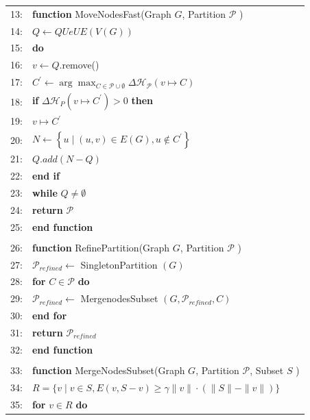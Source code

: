 \documentclass {article}
\begin{document}
	\begin{table}[H]
		\centering
		\begin{tabular}{rl}
			13: & \textbf{function} MoveNodesFast(Graph $G$, Partition $\mathcal{P}$ ) \\
			14: & \quad $Q \leftarrow {QUeUE}(V(G))$ \\
			15: & \quad \textbf{do} \\
			16: & \qquad $v \leftarrow Q$.remove() \\
			17: & \qquad $C^{\prime} \leftarrow \arg \max _{C \in \mathcal{P} \cup \emptyset} \Delta \mathcal{H}_{\mathcal{P}}(v \mapsto C)$ \\
			18: & \qquad \textbf{if} $\Delta \mathcal{H}_P\left(v \mapsto C^{\prime}\right)>0$ \textbf{then} \\
			19: & \qquad \quad $v \mapsto C^{\prime}$ \\
			20: & \qquad \quad $N \leftarrow\left\{u \mid(u, v) \in E(G), u \notin C^{\prime}\right\}$ \\
			21: & \qquad \quad $Q . {add}(N-Q)$ \\
			22: & \qquad \textbf{end if} \\
			23: & \quad \textbf{while} $Q \neq \emptyset$ \\
			24: & \textbf{return} $\mathcal{P}$ \\
			25: & \textbf{end function} \\
			\\
			26: & \textbf{function} RefinePartition(Graph $G$, Partition $\mathcal{P}$ ) \\
			27: & \quad $\mathcal{P}_{ {refined }} \leftarrow$ SingletonPartition $(G)$ \\
			28: & \quad \textbf{for} $C \in \mathcal{P}$ \textbf{do} \\
			29: & \qquad $\mathcal{P}_{ {refined }} \leftarrow$ MergenodesSubset $\left(G, \mathcal{P}_{ {refined }}, C\right)$ \\
			30: & \quad \textbf{end for} \\
			31: & \quad \textbf{return} $\mathcal{P}_{ {refined }}$ \\
			32: & \textbf{end function} \\
			\\
			33: & \textbf{function} MergeNodesSubset(Graph $G$, Partition $\mathcal{P}$, Subset $S$ ) \\
			34: & \quad $R=\{v \mid v \in S, E(v, S-v) \geq \gamma\|v\| \cdot(\|S\|-\|v\|)\}$ \\
			35: & \quad \textbf{for} $v \in R$ \textbf{do} \\

\end{tabular}
\end{table}
\end{document}
